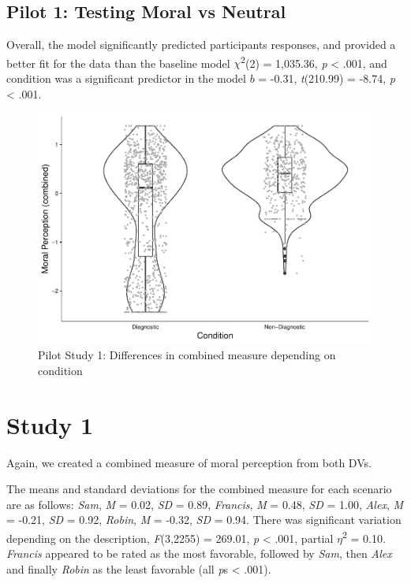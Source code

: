 \documentclass[
  american,
  man,floatsintext]{apa7}
\begin{document}
\hypertarget{pilot-1-testing-moral-vs-neutral}{%
\subsection{Pilot 1: Testing Moral vs Neutral}\label{pilot-1-testing-moral-vs-neutral}}

Overall, the model significantly predicted participants responses, and provided a better fit for the data than the baseline model \(\chi\)\textsuperscript{2}(2) = 1,035.36, \emph{p} \textless{} .001, and condition was a significant predictor in the model \(b\) = -0.31, \emph{t}(210.99) = -8.74, \emph{p} \textless{} .001.

\begin{figure}[!h]
\includegraphics[width=\textwidth,]{Supplementary_files/figure-latex/pilot1cobminedconditionplot-1} \caption{Pilot Study 1: Differences in combined measure depending on condition}\label{fig:pilot1cobminedconditionplot}
\end{figure}

\newpage

\hypertarget{study-1}{%
\section{Study 1}\label{study-1}}

Again, we created a combined measure of moral perception from both DVs.

The means and standard deviations for the combined measure for each scenario are as follows:
\emph{Sam},
\emph{M} = 0.02, \emph{SD} = 0.89,
\emph{Francis},
\emph{M} = 0.48, \emph{SD} = 1.00,
\emph{Alex},
\emph{M} = -0.21, \emph{SD} = 0.92,
\emph{Robin},
\emph{M} = -0.32, \emph{SD} = 0.94. There was significant variation depending on the description, \emph{F}(3,2255) = 269.01, \emph{p} \textless{} .001, partial \(\eta\)\textsuperscript{2} = 0.10. \emph{Francis} appeared to be rated as the most favorable, followed by \emph{Sam}, then \emph{Alex} and finally \emph{Robin} as the least favorable (all \emph{p}s \textless{} .001).
\end{document}
